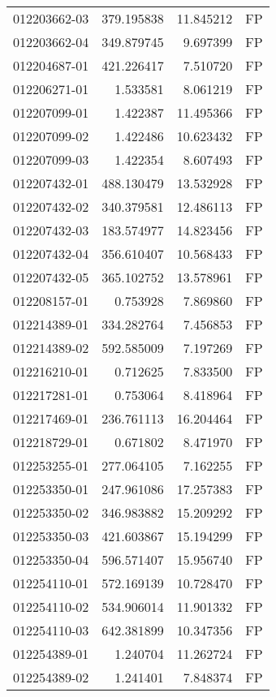 \begin{tabular}{lrrl}
012203662-03 &  379.195838 &    11.845212 &   FP \\
012203662-04 &  349.879745 &     9.697399 &   FP \\
012204687-01 &  421.226417 &     7.510720 &   FP \\
012206271-01 &    1.533581 &     8.061219 &   FP \\
012207099-01 &    1.422387 &    11.495366 &   FP \\
012207099-02 &    1.422486 &    10.623432 &   FP \\
012207099-03 &    1.422354 &     8.607493 &   FP \\
012207432-01 &  488.130479 &    13.532928 &   FP \\
012207432-02 &  340.379581 &    12.486113 &   FP \\
012207432-03 &  183.574977 &    14.823456 &   FP \\
012207432-04 &  356.610407 &    10.568433 &   FP \\
012207432-05 &  365.102752 &    13.578961 &   FP \\
012208157-01 &    0.753928 &     7.869860 &   FP \\
012214389-01 &  334.282764 &     7.456853 &   FP \\
012214389-02 &  592.585009 &     7.197269 &   FP \\
012216210-01 &    0.712625 &     7.833500 &   FP \\
012217281-01 &    0.753064 &     8.418964 &   FP \\
012217469-01 &  236.761113 &    16.204464 &   FP \\
012218729-01 &    0.671802 &     8.471970 &   FP \\
012253255-01 &  277.064105 &     7.162255 &   FP \\
012253350-01 &  247.961086 &    17.257383 &   FP \\
012253350-02 &  346.983882 &    15.209292 &   FP \\
012253350-03 &  421.603867 &    15.194299 &   FP \\
012253350-04 &  596.571407 &    15.956740 &   FP \\
012254110-01 &  572.169139 &    10.728470 &   FP \\
012254110-02 &  534.906014 &    11.901332 &   FP \\
012254110-03 &  642.381899 &    10.347356 &   FP \\
012254389-01 &    1.240704 &    11.262724 &   FP \\
012254389-02 &    1.241401 &     7.848374 &   FP \\

\end{tabular}
